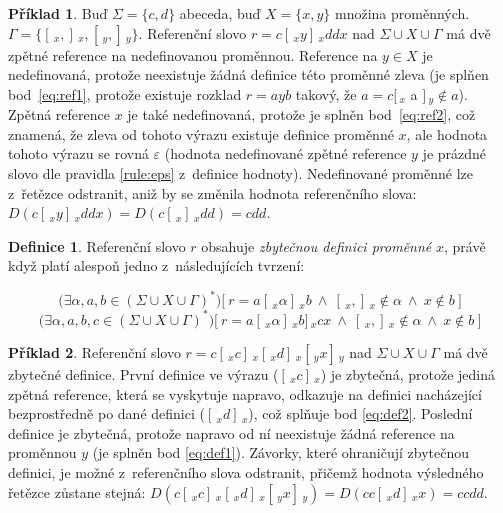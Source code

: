 \documentclass[thesis=B,czech]{FITthesis}[2019/12/23]
\theoremstyle{definition}
\newtheorem{definition}{Definice}[chapter]
\newtheorem{example}{Příklad}[chapter]
\begin{document}
\begin{example}
	Buď $\Sigma = \{c, d\}$ abeceda, buď $X=\{x, y\}$ množina proměnných. $\Gamma = \{[\,_x , ]\,_x, [\,_y , ]\,_y\}$. Referenční slovo $r = c [\,_x y ]\,_x ddx$ nad $\Sigma\cup X\cup\Gamma$ má dvě zpětné reference na nedefinovanou proměnnou. Reference na $y \in X$ je nedefinovaná, protože neexistuje žádná definice této proměnné zleva (je splňen bod~\ref{eq:ref1}, protože existuje rozklad $r=ayb$ takový, že $a = c [\,_x$ a $]\,_y \notin a$). Zpětná reference $x$ je také nedefinovaná, protože je splněn bod~\ref{eq:ref2}, což znamená, že zleva od tohoto výrazu existuje definice proměnné $x$, ale hodnota tohoto výrazu se rovná $\varepsilon$ (hodnota nedefinované zpětné reference $y$ je prázdné slovo dle pravidla \ref{rule:eps} z~definice hodnoty). Nedefinované proměnné lze z~řetězce odstranit, aniž by se změnila hodnota referenčního slova: $D( c [\,_x y ]\,_x ddx ) = D(c [\,_x ]\,_x d d) = cdd$.
\end{example}

\begin{definition}\label{def:ref}
Referenční slovo $r$ obsahuje \emph{zbytečnou definici proměnné} $x$, právě když platí alespoň jedno z~následujících tvrzení:

	\begin{equation}\label{eq:def1}\bigg (\exists  \alpha, a, b \in \left(\Sigma \cup X \cup \Gamma\right)^\ast\bigg) \bigg [ \ r = a [\,_x \alpha  ]\,_x b \ \wedge \  [\,_x, ]\,_x \notin \alpha  \ \wedge \ x \notin b \ \bigg] \end{equation}
	\begin{equation}\label{eq:def2}\bigg(\exists  \alpha, a, b, c \in \left(\Sigma \cup X \cup \Gamma\right)^\ast\bigg) \bigg [ \ r = a [\,_x \alpha  ]\,_x b  ]\,_x c x \ \wedge \  [\,_x, ]\,_x \notin \alpha  \ \wedge \ x \notin b \ \bigg ]\end{equation}
\end{definition}

\begin{example}
	Referenční slovo $r = c [\,_x c ]\,_x [\,_x d ]\,_x [\,_y x ]\,_y$ nad $\Sigma\cup X\cup\Gamma$ má dvě zbytečné definice. První definice ve výrazu ($[\,_x c ]\,_x$) je zbytečná, protože jediná zpětná reference, která se vyskytuje napravo, odkazuje na definici nacházející bezprostředně po dané definici ($ [\,_x d ]\,_x$), což splňuje bod \ref{eq:def2}. Poslední definice je zbytečná, protože napravo od ní neexistuje žádná reference na proměnnou $y$ (je splněn bod \ref{eq:def1}). Závorky, které ohraničují zbytečnou definici, je možné z~referenčního slova odstranit, přičemž hodnota výsledného řetězce zůstane stejná: $D(c [\,_x c ]\,_x [\,_x d ]\,_x [\,_y x ]\,_y)=D(c c [\,_x d ]\,_x x)=ccdd$.
\end{example}
\end{document}
